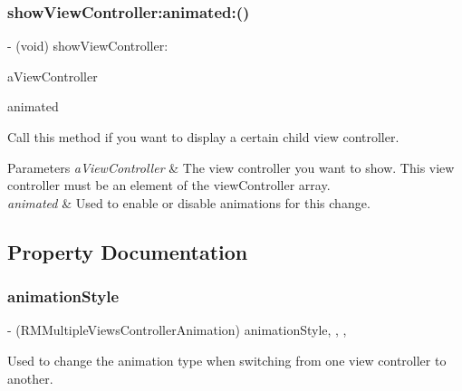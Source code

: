 \subsubsection{\texorpdfstring{show\+View\+Controller\+:animated\+:()}{showViewController:animated:()}}
{\footnotesize\ttfamily -\/ (void) show\+View\+Controller\+: \begin{DoxyParamCaption}\item[{(U\+I\+View\+Controller $\ast$)}]{a\+View\+Controller }\item[{animated:(B\+O\+OL)}]{animated }\end{DoxyParamCaption}}

Call this method if you want to display a certain child view controller.


\begin{DoxyParams}{Parameters}
{\em a\+View\+Controller} & The view controller you want to show. This view controller must be an element of the view\+Controller array. \\
\hline
{\em animated} & Used to enable or disable animations for this change. \\
\hline
\end{DoxyParams}


\subsection{Property Documentation}
\mbox{\label{interface_r_m_multiple_views_controller_ab96e09cddb43777788b9edebbfb06839}} 
\subsubsection{\texorpdfstring{animation\+Style}{animationStyle}}
{\footnotesize\ttfamily -\/ (R\+M\+Multiple\+Views\+Controller\+Animation) animation\+Style\hspace{0.3cm}{\ttfamily [read]}, {\ttfamily [write]}, {\ttfamily [nonatomic]}, {\ttfamily [assign]}}

Used to change the animation type when switching from one view controller to another. \mbox{\label{interface_r_m_multiple_views_controller_a2c5bd2500e378457eefd5530187e39a8}} 
